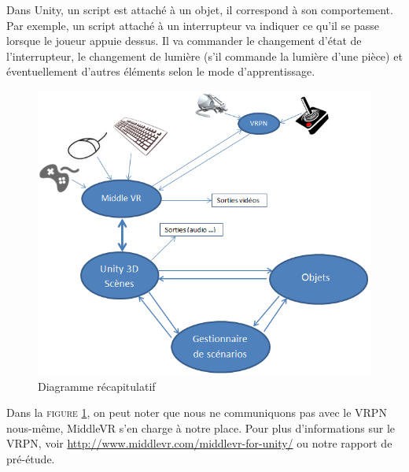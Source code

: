 Dans Unity, un script est attaché à un objet, il correspond à son comportement. Par exemple, un script attaché à un interrupteur va indiquer ce qu'il se passe lorsque le joueur appuie dessus. Il va commander le changement d'état de l'interrupteur, le changement de lumière (s'il commande la lumière d'une pièce) et éventuellement d'autres éléments selon le mode d'apprentissage.\newline
\begin{figure}[h]
\centering
\includegraphics[width=1\textwidth]{4-conception/img/recap.png}
\caption{ Diagramme récapitulatif }
\label{recap}
\end{figure}

Dans la \textsc{figure \ref{recap}}, on peut noter que nous ne communiquons pas avec le VRPN nous-même, MiddleVR s'en charge à notre place. Pour plus d'informations sur le VRPN, voir \url{http://www.middlevr.com/middlevr-for-unity/} ou notre rapport de pré-étude.